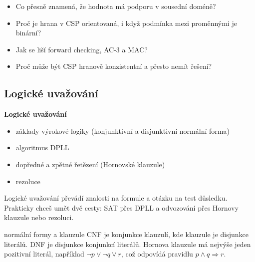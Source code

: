 \begin{recall}
\begin{itemize}[leftmargin=1.2em,itemsep=0pt,topsep=1pt]
  \item Co přesně znamená, že hodnota má podporu v sousední doméně?
  \item Proč je hrana v CSP orientovaná, i když podmínka mezi proměnnými je binární?
  \item Jak se liší forward checking, AC-3 a MAC?
  \item Proč může být CSP hranově konzistentní a přesto nemít řešení?
\end{itemize}
\end{recall}

\subsection{Logické uvažování}

\begin{tema}
\textbf{Logické uvažování}
\begin{itemize}[leftmargin=1.2em,itemsep=0pt,topsep=1pt]
  \item základy výrokové logiky (konjunktivní a disjunktivní normální forma)
  \item algoritmus DPLL
  \item dopředné a zpětné řetězení (Hornovské klauzule)
  \item rezoluce
\end{itemize}
\end{tema}
\begin{vezkratce}
\end{vezkratce}

\ucivo
\begin{intuice}
Logické uvažování převádí znalosti na formule a otázku na test důsledku. Prakticky chceš umět dvě cesty: SAT přes DPLL a odvozování přes Hornovy klauzule nebo rezoluci.
\end{intuice}

\begin{defbox}{normální formy a klauzule}
CNF je konjunkce klauzulí, kde klauzule je disjunkce literálů. DNF je disjunkce konjunkcí literálů. Hornova klauzule má nejvýše jeden pozitivní literál, například $\neg p\lor\neg q\lor r$, což odpovídá pravidlu $p\land q\Rightarrow r$.
\end{defbox}


